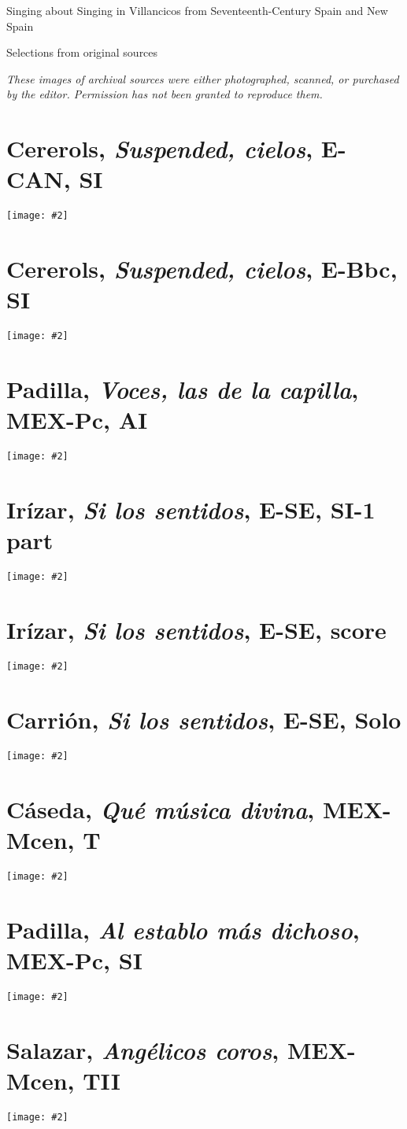 \documentclass[12pt,landscape]{article}
\newcommand{\includescore}[2][]{%
  \texttt{[image: \#2]}%
}
\begin{document}
\vspace*{1em}
\begin{center}
\Large
Singing about Singing in Villancicos from Seventeenth-Century Spain and New Spain

\bigskip
Selections from original sources

\bigskip
\normalsize
\itshape
These images of archival sources were either photographed, scanned, or purchased by the editor.
Permission has not been granted to reproduce them.
\end{center}

\tableofcontents\clearpage

\section{Cererols, \emph{Suspended, cielos}, E-CAN, SI}
\includescore{Cererols-E-CAN}

\section{Cererols, \emph{Suspended, cielos}, E-Bbc, SI}
\includescore{Cererols-E-Bbc}

\section{Padilla, \emph{Voces, las de la capilla}, MEX-Pc, AI}
\includescore[angle=90]{Padilla-Voces-MEX-Pc}

\section{Irízar, \emph{Si los sentidos}, E-SE, SI-1 part}
\includescore{Irizar-E-SE-part}

\section{Irízar, \emph{Si los sentidos}, E-SE, score}
\includescore{Irizar-E-SE-score}

\section{Carrión, \emph{Si los sentidos}, E-SE, Solo}
\includescore{Carrion-E-SE}

\section{Cáseda, \emph{Qué música divina}, MEX-Mcen, T}
\includescore{Caseda-MEX-Mcen}

\section{Padilla, \emph{Al establo más dichoso}, MEX-Pc, SI}
\includescore[angle=90]{Padilla-Al_establo-MEX-Pc}

\section{Salazar, \emph{Angélicos coros}, MEX-Mcen, TII}
\includescore{Salazar-MEX-Mcen}
\end{document}
